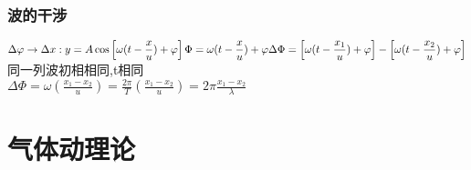 \documentclass[UTF8,a4paper,12pt,scheme=chinese]{ctexbook}
\begin{document}
\begin{Large}
		\subsection{波的干涉}
		$\displaystyle\\
		\Delta \varphi \rightarrow \Delta x:\\
		y=A\cos \left[\omega(t-\frac{x}{u})+\varphi\right]\\
		\Phi = \omega(t-\frac{x}{u})+\varphi\\
		\Delta \Phi = \left[\omega(t-\frac{x_1}{u})+\varphi\right] - \left[\omega(t-\frac{x_2}{u})+\varphi\right]
		$\\
		同一列波初相相同,t相同\\
		$\displaystyle
		\Delta \Phi = \omega\left(\frac{x_1-x_2}{u}\right) = \frac{2\pi}{T}\left(\frac{x_1-x_2}{u}\right) = 2\pi\frac{x_1-x_2}{\lambda}
		$
		\chapter{气体动理论}
	\end{Large}
\end{document}
